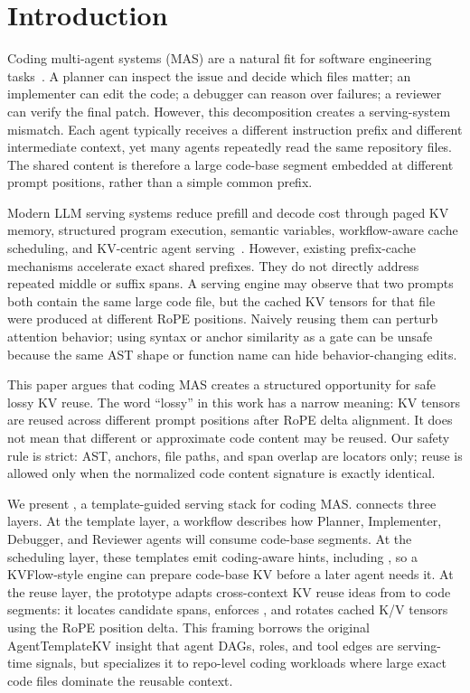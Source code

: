 \section{Introduction}

Coding multi-agent systems (MAS) are a natural fit for software engineering tasks~\cite{swebench,multiagent2025,llmagents2024}.
A planner can inspect the issue and decide which files matter; an implementer can edit the code; a debugger can reason over failures; a reviewer can verify the final patch.
However, this decomposition creates a serving-system mismatch.
Each agent typically receives a different instruction prefix and different intermediate context, yet many agents repeatedly read the same repository files.
The shared content is therefore a large code-base segment embedded at different prompt positions, rather than a simple common prefix.

Modern LLM serving systems reduce prefill and decode cost through paged KV memory, structured program execution, semantic variables, workflow-aware cache scheduling, and KV-centric agent serving~\cite{kwon2023vllm,zheng2023sglang,parrot2024,kvflow2025,tokencake2025}.
However, existing prefix-cache mechanisms accelerate exact shared prefixes.
They do not directly address repeated middle or suffix spans.
A serving engine may observe that two prompts both contain the same large code file, but the cached KV tensors for that file were produced at different RoPE positions.
Naively reusing them can perturb attention behavior; using syntax or anchor similarity as a gate can be unsafe because the same AST shape or function name can hide behavior-changing edits.

This paper argues that coding MAS creates a structured opportunity for safe lossy KV reuse.
The word ``lossy'' in this work has a narrow meaning: KV tensors are reused across different prompt positions after RoPE delta alignment.
It does not mean that different or approximate code content may be reused.
Our safety rule is strict: AST, anchors, file paths, and span overlap are locators only; reuse is allowed only when the normalized code content signature is exactly identical.

We present \system, a template-guided serving stack for coding MAS.
\system connects three layers.
At the template layer, a workflow describes how Planner, Implementer, Debugger, and Reviewer agents will consume code-base segments.
At the scheduling layer, these templates emit coding-aware hints, including \prefetchhint, so a KVFlow-style engine can prepare code-base KV before a later agent needs it.
At the reuse layer, the prototype adapts cross-context KV reuse ideas from \kvcomm to code segments: it locates candidate spans, enforces \exactgate, and rotates cached K/V tensors using the RoPE position delta.
This framing borrows the original AgentTemplateKV insight that agent DAGs, roles, and tool edges are serving-time signals, but specializes it to repo-level coding workloads where large exact code files dominate the reusable context.

